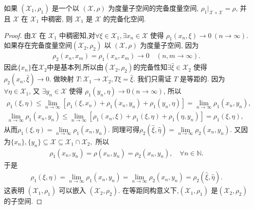 \documentclass[../../main.tex]{subfiles}%
\begin{document}
\begin{proposition}\label{proposition:稠密的度量子空间得到完备化空间}
如果 $(\mathscr{X}_1,\rho_1)$ 是一个以 $(\mathscr{X},\rho)$ 为度量子空间的完备度量空间, $\rho_1|_{\mathscr{X}\times\mathscr{X}}=\rho$, 并且 $\mathscr{X}$ 在 $\mathscr{X}_1$ 中稠密, 则 $\mathscr{X}_1$ 是 $\mathscr{X}$ 的完备化空间.
\end{proposition}
\begin{proof}

由$\mathscr{X}$ 在 $\mathscr{X}_1$ 中稠密知,对$\forall\xi\in\mathscr{X}_1,\exists x_n\in\mathscr{X}$ 使得 $\rho_1(x_n,\xi)\to0\ (n\to\infty)$. 如果存在完备度量空间$(\mathscr{X}_2,\rho_2)$ 以 $(\mathscr{X},\rho)$ 为度量子空间, 因为
\begin{align*}
\rho_2(x_n,x_m)=\rho_1(x_n,x_m)\to0\quad (n,m\to\infty).
\end{align*}
因此$\{x_n\}$在$\mathscr{X}_2$中是基本列,所以由$(\mathscr{X}_2,\rho_2)$的完备性知$\exists\hat{\xi}\in\mathscr{X}_2$ 使得 $\rho_2(x_n,\hat{\xi})\to0$. 做映射 $T:\mathscr{X}_1\to\mathscr{X}_2,T\xi=\hat{\xi}$. 我们只需证 $T$ 是等距的. 因为 $\forall\eta\in\mathscr{X}_1$, 又 $\exists y_n\in\mathscr{X}$ 使得 $\rho_1(y_n,\eta)\to0(n\to \infty)$, 所以
\begin{align*}
\rho_1(\xi,\eta) \leqslant \lim\limits_{n\rightarrow \infty} \left[ \rho_1(\xi,x_n) + \rho_1(x_n,y_n) + \rho_1(y_n,\eta) \right] = \lim\limits_{n\rightarrow \infty} \rho_1(x_n,y_n),\\
\lim\limits_{n\rightarrow \infty} \rho_1(x_n,y_n) \leqslant \lim\limits_{n\rightarrow \infty} \left[ \rho_1(x_n,\xi) + \rho_1(\xi,\eta) + \rho_1(\eta,y_n) \right] = \rho_1(\xi,\eta),
\end{align*}
从而$\rho_1(\xi,\eta) = \lim\limits_{n\rightarrow \infty} \rho_1(x_n,y_n).$ 同理可得$\rho_2(\hat{\xi},\hat{\eta}) = \lim\limits_{n\rightarrow \infty} \rho_2(x_n,y_n).$ 又因为$\{x_n\},\{y_n\} \subseteq \mathscr{X} \subseteq \mathscr{X}_1\cap \mathscr{X}_2,$ 所以
\begin{align*}
\rho_1(x_n,y_n) = \rho(x_n,y_n) = \rho_2(x_n,y_n),\quad \forall n\in \mathbb{N}.
\end{align*}
于是
\begin{align*}
\rho_1(\xi,\eta) = \lim\limits_{n\rightarrow \infty} \rho_1(x_n,y_n) = \lim\limits_{n\rightarrow \infty} \rho_2(x_n,y_n) = \rho_2(\hat{\xi},\hat{\eta}).
\end{align*}
这表明 $(\mathscr{X}_1,\rho_1)$ 可以嵌入 $(\mathscr{X}_2,\rho_2)$. 在等距同构意义下,$(\mathscr{X}_1,\rho_1)$ 是$(\mathscr{X}_2,\rho_2)$的子空间.

\end{proof}
\end{document}
